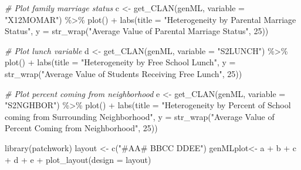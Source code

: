 \documentclass[
]{article}
\newenvironment{Shaded}{\begin{snugshade}}{\end{snugshade}}
\newcommand{\AttributeTok}[1]{\textcolor[rgb]{0.77,0.63,0.00}{#1}}
\newcommand{\CommentTok}[1]{\textcolor[rgb]{0.56,0.35,0.01}{\textit{#1}}}
\newcommand{\DecValTok}[1]{\textcolor[rgb]{0.00,0.00,0.81}{#1}}
\newcommand{\FunctionTok}[1]{\textcolor[rgb]{0.00,0.00,0.00}{#1}}
\newcommand{\NormalTok}[1]{#1}
\newcommand{\OtherTok}[1]{\textcolor[rgb]{0.56,0.35,0.01}{#1}}
\newcommand{\SpecialCharTok}[1]{\textcolor[rgb]{0.00,0.00,0.00}{#1}}
\newcommand{\StringTok}[1]{\textcolor[rgb]{0.31,0.60,0.02}{#1}}
\begin{document}
\begin{Shaded}
\begin{Highlighting}[]
\CommentTok{\# Plot family marriage status}
\NormalTok{c }\OtherTok{\textless{}{-}} \FunctionTok{get\_CLAN}\NormalTok{(genML,}
         \AttributeTok{variable =} \StringTok{"X12MOMAR"}\NormalTok{) }\SpecialCharTok{\%\textgreater{}\%}
  \FunctionTok{plot}\NormalTok{() }\SpecialCharTok{+}
  \FunctionTok{labs}\NormalTok{(}\AttributeTok{title =} \StringTok{"Heterogeneity by Parental Marriage Status"}\NormalTok{,}
       \AttributeTok{y =} \FunctionTok{str\_wrap}\NormalTok{(}\StringTok{"Average Value of Parental Marriage Status"}\NormalTok{, }\DecValTok{25}\NormalTok{))}


\CommentTok{\# Plot lunch variable}
\NormalTok{d }\OtherTok{\textless{}{-}} \FunctionTok{get\_CLAN}\NormalTok{(genML,}
         \AttributeTok{variable =} \StringTok{"S2LUNCH"}\NormalTok{) }\SpecialCharTok{\%\textgreater{}\%}
  \FunctionTok{plot}\NormalTok{() }\SpecialCharTok{+}
  \FunctionTok{labs}\NormalTok{(}\AttributeTok{title =} \StringTok{"Heterogeneity by Free School Lunch"}\NormalTok{,}
       \AttributeTok{y =} \FunctionTok{str\_wrap}\NormalTok{(}\StringTok{"Average Value of Students Receiving Free Lunch"}\NormalTok{, }\DecValTok{25}\NormalTok{))}

\CommentTok{\# Plot percent coming from neighborhood}
\NormalTok{e }\OtherTok{\textless{}{-}} \FunctionTok{get\_CLAN}\NormalTok{(genML,}
         \AttributeTok{variable =} \StringTok{"S2NGHBOR"}\NormalTok{) }\SpecialCharTok{\%\textgreater{}\%}
  \FunctionTok{plot}\NormalTok{() }\SpecialCharTok{+}
  \FunctionTok{labs}\NormalTok{(}\AttributeTok{title =} \StringTok{"Heterogeneity by Percent of School coming from }
\StringTok{       Surrounding Neighborhood"}\NormalTok{,}
       \AttributeTok{y =} \FunctionTok{str\_wrap}\NormalTok{(}\StringTok{"Average Value of Percent Coming from Neighborhood"}\NormalTok{, }\DecValTok{25}\NormalTok{))}


\FunctionTok{library}\NormalTok{(patchwork)}
\NormalTok{layout }\OtherTok{\textless{}{-}} \FunctionTok{c}\NormalTok{(}\StringTok{"\#AA\#}
\StringTok{            BBCC}
\StringTok{            DDEE"}\NormalTok{)}
\NormalTok{genMLplot}\OtherTok{\textless{}{-}}\NormalTok{ a }\SpecialCharTok{+}\NormalTok{ b }\SpecialCharTok{+}\NormalTok{ c }\SpecialCharTok{+}\NormalTok{ d }\SpecialCharTok{+}\NormalTok{ e }\SpecialCharTok{+}
  \FunctionTok{plot\_layout}\NormalTok{(}\AttributeTok{design =}\NormalTok{ layout)}
\end{Highlighting}
\end{Shaded}

\newpage
\end{document}
